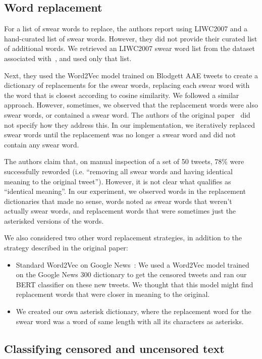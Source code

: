 \subsection{Word replacement}

For a list of swear words to replace, the authors report using LIWC2007 and a hand-curated list of swear words. However, they did not provide their curated list of additional words.  We retrieved an LIWC2007 swear word list from the dataset associated with~\cite{kwon2017offensive}, and used only that list.

Next, they used the Word2Vec model trained on Blodgett AAE tweets to create a dictionary of replacements for the swear words, replacing each swear word with the word that is closest according to cosine similarity. We followed a similar approach. 
However, sometimes, we observed that the replacement words were also swear words, or contained a swear word. The authors of the original paper~\cite{aae_paper} did not specify how they address this. In our implementation, we iteratively replaced swear words until the replacement was no longer a swear word and did not contain any swear word.

The authors claim that, on manual inspection of a set of 50 tweets, 78\% were successfully reworded (i.e. ``removing all swear words and having identical meaning to the original tweet''). However, it is not clear what qualifies as ``identical meaning''. In our experiment, we observed words in the replacement dictionaries that made no sense, words noted as swear words that weren't actually swear words, and replacement words that were sometimes just the asterisked versions of the words.


We also considered two other word replacement strategies, in addition to the strategy described in the original paper:
\begin{itemize}
    \item Standard Word2Vec on Google News~\cite{rehurek2011gensim}: We used a Word2Vec model trained on the Google News 300 dictionary to get the censored tweets and ran our BERT classifier on these new tweets. We thought that this model might find replacement words that were closer in meaning to the original.
    \item We created our own asterisk dictionary, where the replacement word for the swear word was a word of same length with all its characters as asterisks. 
\end{itemize}


\subsection{Classifying censored and uncensored text}

